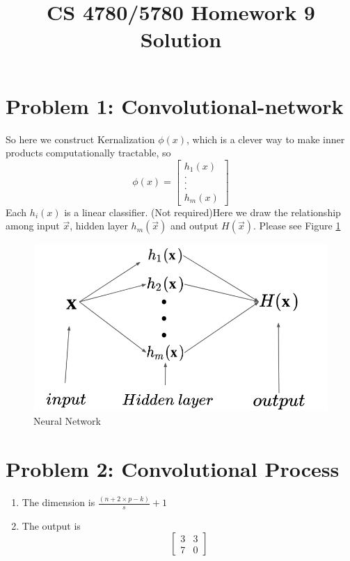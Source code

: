 \documentclass{article}
\title{CS 4780/5780 Homework 9 Solution\vspace{-10pt}}
\author{}
\date{}
\begin{document}
\maketitle

\section*{Problem 1: Convolutional-network}
	So here we construct Kernalization $\phi(x)$, which is a clever way to make inner products computationally tractable, so $$\phi(x)=\begin{bmatrix}
	h_{1}(x)\\
	.\\
	.\\
	.\\
	h_{m}(x)
	\end{bmatrix}$$ Each $h_{i}(x)$ is a linear classifier.
	(Not required)Here we draw the relationship among input $\vec{x}$, hidden layer $h_{m}(\vec{x})$ and output $H(\vec{x})$. Please see Figure \ref{fig:hw9_1}
	\begin{figure}
		\centering
		\includegraphics[width=5in,height=2.5in]{hw9_1.png}
		\caption{Neural Network}
		\label{fig:hw9_1}
	\end{figure}
\section*{Problem 2: Convolutional Process}
\begin{enumerate}
	\item The dimension is $\frac{(n+2\times p -k)}{s}+ 1$
	\item The output is 
	 $$\begin{bmatrix}
	3&3 \\ 7 & 0  
	\end{bmatrix}$$
	
\end{enumerate}
\end{document}
